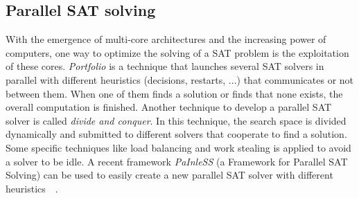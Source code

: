 \subsection{Parallel SAT solving}
With the emergence of multi-core architectures and the increasing power of computers, one way to optimize the solving
of a SAT problem is the exploitation of these cores. %
\emph{Portfolio} is a technique that launches several SAT solvers in parallel with different heuristics (decisions, restarts, ...) that 
communicates or not between them. When one of them finds a solution or finds that none exists, the overall computation is finished.
Another technique to develop a parallel SAT solver is called \emph{divide and conquer}. In this technique,
the search space is divided  dynamically and submitted to different solvers that cooperate to find a solution.
 Some specific techniques like load balancing and work stealing is applied to avoid a solver to be idle.
A recent framework \emph{PaInleSS} (a Framework for Parallel SAT Solving) can be used to easily create a new parallel 
SAT solver with different heuristics~\cite{le2017painless}~\cite{le2019modular}. 

%
